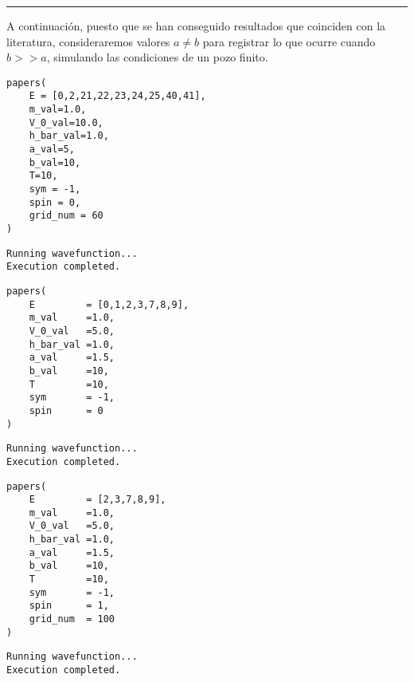 \documentclass[11pt]{article}
\begin{document}
\noindent\rule{\textwidth}{0.5pt}

A continuación, puesto que se han conseguido resultados que coinciden con la
literatura, consideraremos valores \(a \neq b\) para registrar lo que ocurre
cuando \(b >> a\), simulando las condiciones de un pozo finito.
\begin{verbatim}
papers(
    E = [0,2,21,22,23,24,25,40,41],
    m_val=1.0,
    V_0_val=10.0,
    h_bar_val=1.0,
    a_val=5,
    b_val=10,
    T=10,
    sym = -1,
    spin = 0,
    grid_num = 60
)
\end{verbatim}

\label{orgec0779b}
\begin{verbatim}
Running wavefunction...
Execution completed.
\end{verbatim}

\begin{center}

\end{center}

\begin{verbatim}
papers(
    E         = [0,1,2,3,7,8,9],
    m_val     =1.0,
    V_0_val   =5.0,
    h_bar_val =1.0,
    a_val     =1.5,
    b_val     =10,
    T         =10,
    sym       = -1,
    spin      = 0
)
\end{verbatim}

\label{orgf0eae15}
\begin{verbatim}
Running wavefunction...
Execution completed.
\end{verbatim}

\begin{center}

\end{center}

\begin{verbatim}
papers(
    E         = [2,3,7,8,9],
    m_val     =1.0,
    V_0_val   =5.0,
    h_bar_val =1.0,
    a_val     =1.5,
    b_val     =10,
    T         =10,
    sym       = -1,
    spin      = 1,
    grid_num  = 100
)
\end{verbatim}

\label{org703d6b2}
\begin{verbatim}
Running wavefunction...
Execution completed.
\end{verbatim}
\end{document}
